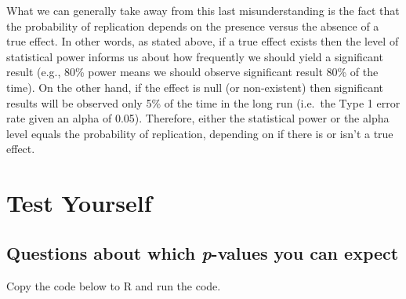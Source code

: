 \documentclass[
  oneside]{book}
\begin{document}
What we can generally take away from this last misunderstanding is the fact that the probability of replication depends on the presence versus the absence of a true effect. In other words, as stated above, if a true effect exists then the level of statistical power informs us about how frequently we should yield a significant result (e.g., 80\% power means we should observe significant result 80\% of the time). On the other hand, if the effect is null (or non-existent) then significant results will be observed only 5\% of the time in the long run (i.e.~the Type 1 error rate given an alpha of 0.05). Therefore, either the statistical power or the alpha level equals the probability of replication, depending on if there is or isn't a true effect.

\hypertarget{test-yourself}{%
\section{Test Yourself}\label{test-yourself}}

\hypertarget{questions-about-which-p-values-you-can-expect}{%
\subsection{\texorpdfstring{Questions about which \emph{p}-values you can expect}{Questions about which p-values you can expect}}\label{questions-about-which-p-values-you-can-expect}}

Copy the code below to R and run the code.
\end{document}
